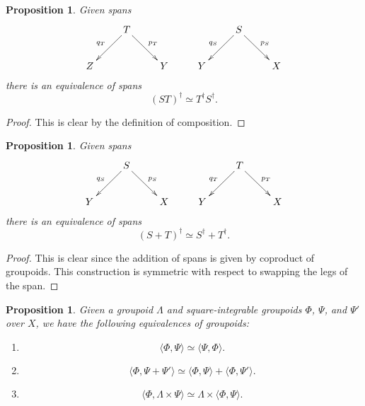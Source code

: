 \documentclass{article}
\newcommand{\ip}[2]{\langle #1,#2 \rangle}
\newtheorem{proposition}[thm]{Proposition}
\begin{document}
\begin{proposition}\label{adjoint_comp}
Given spans
\[
\xymatrix{
  & T \ar[dl]_{q_T} \ar[dr]^{p_T}  & & & S \ar[dl]_{q_S} \ar[dr]^{p_S} &\\
 Z & & Y & Y & & X 
}
\]
there is an equivalence of spans
\[(ST)^\dagger \simeq T^\dagger S^\dagger. \]
\end{proposition}

\begin{proof}
This is clear by the definition of composition.
\end{proof}

\begin{proposition}\label{adjoint_add}
Given spans
\[
\xymatrix{
& S \ar[dl]_{q_S} \ar[dr]^{p_S} & & & T \ar[dl]_{q_T} \ar[dr]^{p_T} & \\
Y & & X & Y & & X
}
\]
there is an equivalence of spans
\[(S+T)^\dagger \simeq S^\dagger + T^\dagger. \]
\end{proposition}

\begin{proof}
This is clear since the addition of spans is given by 
coproduct of groupoids.  This construction is symmetric
with respect to swapping the legs of the span.
\end{proof}

\begin{proposition}
\label{innerprodandadjointprops}
Given a groupoid $\Lambda$ and square-integrable
groupoids $\Phi$, $\Psi$, and $\Psi'$ over $X$, we have the
following equivalences of groupoids:
\begin{enumerate}
\item
\[\ip{\Phi}{\Psi} \simeq \ip{\Psi}{\Phi}.\] 
\item
\[\ip{\Phi}{\Psi + \Psi'} \simeq \ip{\Phi}{\Psi} + \ip{\Phi}{\Psi'}.\] 
\item
\[\ip{\Phi}{\Lambda \times \Psi} \simeq \Lambda \times \ip{\Phi}{\Psi}.\]
\end{enumerate}
\end{proposition}
\end{document}
